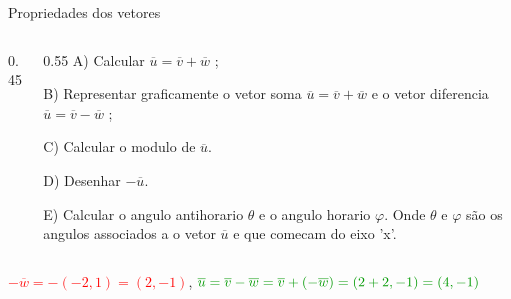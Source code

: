 \documentclass{beamer}
\begin{document}
\begin{frame}{Propriedades dos vetores}
\begin{columns}[T]
\begin{column}{0.45\textwidth}
\vspace{0.2cm}


		\end{column}
		
		\begin{column}{0.55\textwidth}
			A) Calcular $\overline{u} = \overline{v} + \overline{w}$ ;
			
			\vspace{0.1cm}
			B) Representar graficamente o vetor soma $\overline{u} = \overline{v} + \overline{w}$ e o vetor diferencia $\overline{u} = \overline{v} - \overline{w}$ ;
			
			\vspace{0.3cm}
			C) Calcular o modulo de $\overline{u}$.
			
			\vspace{0.3cm}
			D) Desenhar $-\overline{u}$.
			
			\vspace{0.3cm}
			E) Calcular o angulo antihorario $\theta$ e o angulo horario $\varphi$. Onde $\theta$ e $\varphi$ são os angulos associados a o vetor $\overline{u}$ e que comecam do eixo 'x'.
		\end{column}
	\end{columns}
	
\textcolor{red}{$-\overline{w} = -(-2,1) = (2,-1)$}, $\textcolor{green!60!black}{	\overline{u} = \overline{v} - \overline{w} = \overline{v} + (-\overline{w})=(2+2,-1)= (4,-1) }$
	
\vspace{0.2cm}	
\end{frame}
\end{document}
